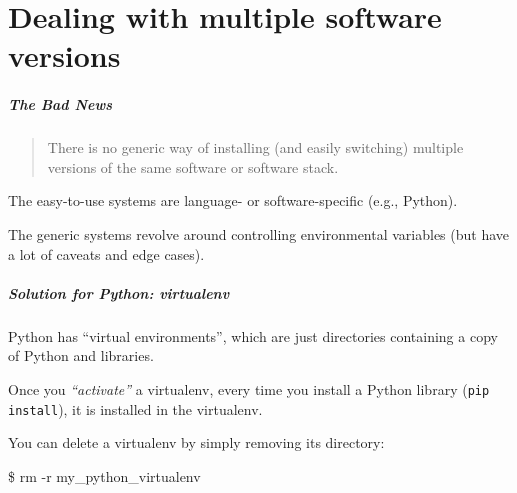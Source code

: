 \documentclass[english,serif,mathserif,usenames,dvipsnames]{beamer}
\begin{document}
\part{Dealing with multiple software versions}

\begin{frame}
  \frametitle{The Bad News}

  \begin{quote}
    There is no generic way of installing (and easily switching)
    multiple versions of the same software or software stack.
  \end{quote}

  \+
  The easy-to-use systems are language- or
  software-specific (e.g., Python).

  \+
  The generic systems revolve around controlling environmental
  variables (but have a lot of caveats and edge cases).
\end{frame}


\begin{frame}[fragile]
  \frametitle{Solution for Python: virtualenv}

  Python has ``virtual environments'', which are just directories
  containing a copy of Python and libraries.

  \+
  Once you \emph{``activate''} a virtualenv, every time you install
  a Python library (\texttt{pip install}), it is installed in the
  virtualenv.

  \+
  You can delete a virtualenv by simply removing its directory:
\begin{semiverbatim}
\$ rm -r my_python_virtualenv
\end{semiverbatim}
\end{frame}
\end{document}
